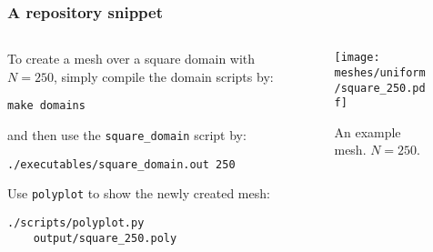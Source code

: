 \begin{frame}[fragile]
    \frametitle{A repository snippet}

    \begin{columns} %
        \begin{column}{0.60\textwidth}
            To create a mesh over a square domain with $N = 250$, simply compile the domain scripts by:

\begin{lstlisting}
make domains
\end{lstlisting}
    
            and then use the \lstinline{square_domain} script by:
    
\begin{lstlisting}
./executables/square_domain.out 250
\end{lstlisting}
    
            Use \lstinline{polyplot} to show the newly created mesh:
    
\begin{lstlisting}
./scripts/polyplot.py
    output/square_250.poly
\end{lstlisting}
        \end{column}
    
        \begin{column}{0.40\textwidth}
            \begin{flushleft}
                \begin{figure}[!ht]
                    \texttt{[image: meshes/uniform/square\_250.pdf]}
                    \caption{An example mesh. $N = 250$.}
                \end{figure}
            \end{flushleft}
        \end{column}
    \end{columns}

\end{frame}